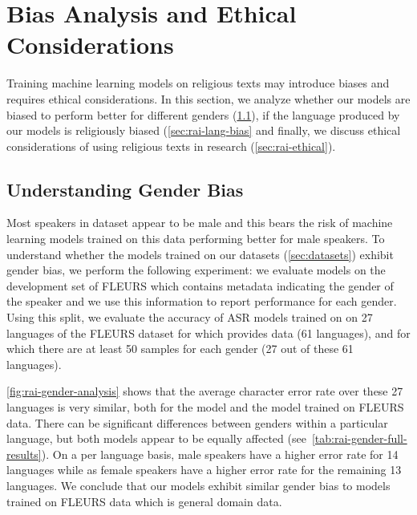 \section{Bias Analysis and Ethical Considerations}

Training machine learning models on religious texts may introduce biases and requires ethical considerations. 
In this section, we analyze whether our models are biased to perform better for different genders (\textsection\ref{sec:rai-gender-bias}), if the language produced by our models is religiously biased (\textsection\ref{sec:rai-lang-bias} and finally, we discuss ethical considerations of using religious texts in research (\textsection\ref{sec:rai-ethical}).


\subsection{Understanding Gender Bias}
\label{sec:rai-gender-bias}

Most speakers in \MMS{} dataset appear to be male and this bears the risk of machine learning models trained on this data performing better for male speakers.
To understand whether the models trained on our datasets (\textsection\ref{sec:datasets}) exhibit gender bias, we perform the following experiment:
we evaluate models on the development set of FLEURS which contains metadata indicating the gender of the speaker and we use this information to report performance for each gender.
Using this split, we evaluate the accuracy of ASR models trained on \MMS{} on 27 languages of the FLEURS dataset for which \MMS{} provides data (61 languages), and for which there are at least 50 samples for each gender (27 out of these 61 languages).

\insertGenderAnalysis

\autoref{fig:rai-gender-analysis} shows that the average character error rate over these 27 languages is very similar, both for the \modelname{} model and the model trained on FLEURS data.
There can be significant differences between genders within a particular language, but both models appear to be equally affected (see~\autoref{tab:rai-gender-full-results}).
On a per language basis, male speakers have a higher error rate for 14 languages while as female speakers have a higher error rate for the remaining 13 languages.
We conclude that our models exhibit similar gender bias to models trained on FLEURS data which is general domain data.
 


